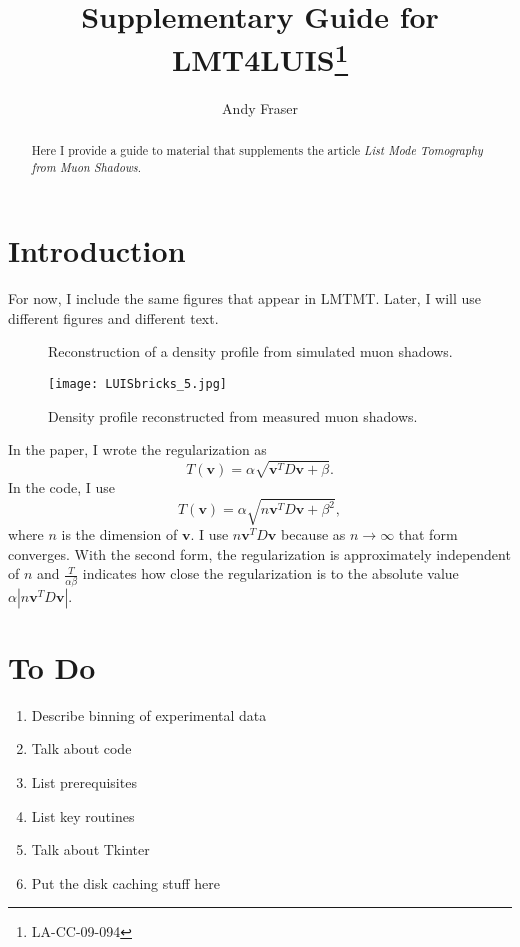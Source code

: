 \documentclass[twocolumn]{article}
\title{Supplementary Guide for LMT4LUIS\footnote{LA-CC-09-094}}
\author{Andy Fraser}
\newcommand{\av}{\mathbf{v}}%
\begin{document}
\maketitle
\begin{abstract}
  Here I provide a guide to material that supplements the article
  \emph{List Mode Tomography from Muon Shadows}.
\end{abstract}

\section{Introduction}
\label{sec:introduction}

For now, I include the same figures that appear in LMTMT.  Later, I
will use different figures and different text.

\begin{figure*}
  \centering 
  \resizebox{0.32\textwidth}{!}{ } 
  \resizebox{0.32\textwidth}{!}{ }
  \resizebox{0.32\textwidth}{!}{ }  
  \caption{Reconstruction of a density profile from simulated muon shadows.}
  \label{fig:sim1}
\end{figure*}

\begin{figure}
  \centering
  \texttt{[image: LUISbricks\_5.jpg]}
  \resizebox{0.48\textwidth}{!}{ }  
  \caption{Density profile reconstructed from measured muon shadows.}
  \label{fig:exp1}
\end{figure}

In the paper, I wrote the regularization as
\begin{equation*}
  T(\av) = \alpha \sqrt{\av^T D \av + \beta}.
\end{equation*}
In the code, I use
\begin{equation*}
  T(\av) = \alpha \sqrt{n\av^T D \av + \beta^2},
\end{equation*}
where $n$ is the dimension of $\av$.  I use $n\av^T D \av$ because as
$n\rightarrow \infty$ that form converges.  With the second form, the
regularization is approximately independent of $n$ and
$\frac{T}{\alpha\beta}$ indicates how close the regularization is to
the absolute value $\alpha\left|n\av^T D \av\right|$.

\section{To Do}
\label{sec:todo}

\begin{enumerate}
\item Describe binning of experimental data
\item Talk about code
\item List prerequisites
\item List key routines
\item Talk about Tkinter
\item Put the disk caching stuff here
\end{enumerate}
\end{document}
